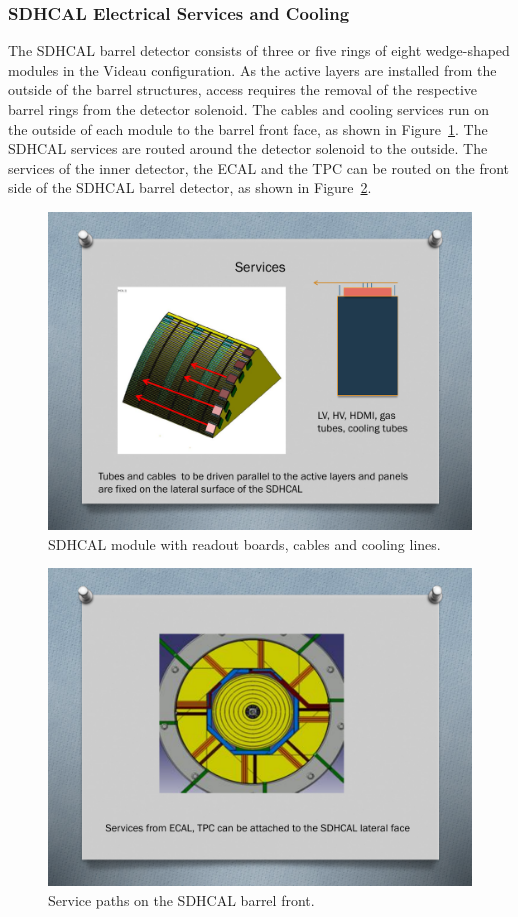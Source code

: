 \subsubsection{SDHCAL Electrical Services and Cooling}
The SDHCAL barrel detector consists of three or five rings of eight wedge-shaped modules in the Videau configuration. As the active layers are installed from the outside of the barrel structures, access requires the removal of the respective barrel rings from the detector solenoid. The cables and cooling services run on the outside of each module to the barrel front face, as shown in Figure~\ref{ILD:fig:sdcal_module_services}. The SDHCAL services are routed around the detector solenoid to the outside. The services of the inner detector, the ECAL and the TPC can be routed on the front side of the SDHCAL barrel detector, as shown in Figure~\ref{ILD:fig:sdhcal_barrel_services}.
\begin{figure}[h!]
    \centering
        \includegraphics[width=0.8\hsize]{Integration/fig/SDHCAL_Module_Services.pdf}
    \caption{SDHCAL module with readout boards, cables and cooling lines.}
    \label{ILD:fig:sdcal_module_services}
\end{figure}
\begin{figure}[h!]
    \centering
        \includegraphics[width=0.8\hsize]{Integration/fig/SDHCAL_Barrel_Services.pdf}
    \caption{Service paths on the SDHCAL barrel front.}
    \label{ILD:fig:sdhcal_barrel_services}
\end{figure}

